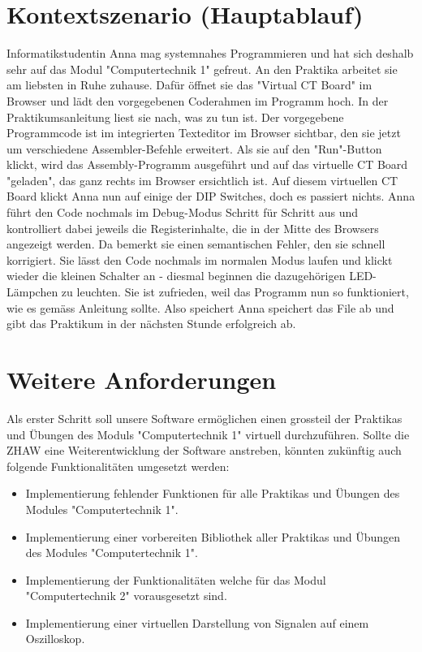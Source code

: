 \documentclass[10pt]{article}
\begin{document}
\section{Kontextszenario (Hauptablauf)}

Informatikstudentin Anna mag systemnahes Programmieren und hat sich deshalb sehr auf das Modul "Computertechnik 1" gefreut. An den Praktika arbeitet sie am liebsten in Ruhe zuhause. Dafür öffnet sie das "Virtual CT Board" im Browser und lädt den vorgegebenen Coderahmen im Programm hoch. In der Praktikumsanleitung liest sie nach, was zu tun ist. Der vorgegebene Programmcode ist im integrierten Texteditor im Browser sichtbar, den sie jetzt um verschiedene Assembler-Befehle erweitert. Als sie auf den "Run"-Button klickt, wird das Assembly-Programm ausgeführt und auf das virtuelle CT Board "geladen", das ganz rechts im Browser ersichtlich ist. 
\newline Auf diesem virtuellen CT Board klickt Anna nun auf einige der DIP Switches, doch es passiert nichts. Anna führt den Code nochmals im Debug-Modus Schritt für Schritt aus und kontrolliert dabei jeweils die Registerinhalte, die in der Mitte des Browsers angezeigt werden. Da bemerkt sie einen semantischen Fehler, den sie schnell korrigiert. Sie lässt den Code nochmals im normalen Modus laufen und klickt wieder die kleinen Schalter an - diesmal beginnen die dazugehörigen LED-Lämpchen zu leuchten. Sie ist zufrieden, weil das Programm nun so funktioniert, wie es gemäss Anleitung sollte. Also speichert Anna speichert das File ab und gibt das Praktikum in der nächsten Stunde erfolgreich ab.

\section{Weitere Anforderungen}
Als erster Schritt soll unsere Software ermöglichen einen grossteil der Praktikas und Übungen des Moduls "Computertechnik 1" virtuell durchzuführen. Sollte die ZHAW eine Weiterentwicklung der Software anstreben, könnten zukünftig auch folgende Funktionalitäten umgesetzt werden: 
\begin{itemize}
\item Implementierung fehlender Funktionen für alle Praktikas und Übungen des Modules "Computertechnik 1". 
\item Implementierung einer vorbereiten Bibliothek aller Praktikas und Übungen des Modules "Computertechnik 1". 
\item Implementierung der Funktionalitäten welche für das Modul "Computertechnik 2" vorausgesetzt sind. 
\item Implementierung einer virtuellen Darstellung von Signalen auf einem Oszilloskop.
\end{itemize}
\end{document}
